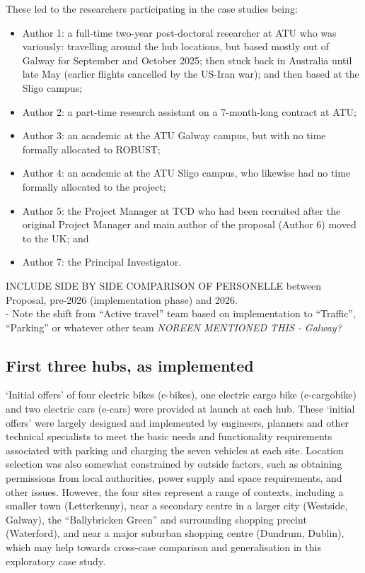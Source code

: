 \documentclass[preprint, 3p,
authoryear]{elsarticle} %
\providecommand{\tightlist}{%
  \setlength{\itemsep}{0pt}\setlength{\parskip}{0pt}}
\begin{document}
These led to the researchers participating in the case studies being:

\begin{itemize}
\tightlist
\item
  Author 1: a full-time two-year post-doctoral researcher at ATU who was
  variously: travelling around the hub locations, but based mostly out
  of Galway for September and October 2025; then stuck back in Australia
  until late May (earlier flights cancelled by the US-Iran war); and
  then based at the Sligo campus;
\item
  Author 2: a part-time research assistant on a 7-month-long contract at
  ATU;
\item
  Author 3: an academic at the ATU Galway campus, but with no time
  formally allocated to ROBUST;
\item
  Author 4: an academic at the ATU Sligo campus, who likewise had no
  time formally allocated to the project;
\item
  Author 5: the Project Manager at TCD who had been recruited after the
  original Project Manager and main author of the proposal (Author 6)
  moved to the UK; and
\item
  Author 7: the Principal Investigator.
\end{itemize}

INCLUDE SIDE BY SIDE COMPARISON OF PERSONELLE between Proposal, pre-2026
(implementation phase) and 2026.\\
- Note the shift from ``Active travel'' team based on implementation to
``Traffic'', ``Parking'' or whatever other team \emph{NOREEN MENTIONED
THIS - Galway?}

\subsection{First three hubs, as
implemented}\label{first-three-hubs-as-implemented}

`Initial offers' of four electric bikes (e-bikes), one electric cargo
bike (e-cargobike) and two electric cars (e-cars) were provided at
launch at each hub. These `initial offers' were largely designed and
implemented by engineers, planners and other technical specialists to
meet the basic needs and functionality requirements associated with
parking and charging the seven vehicles at each site. Location selection
was also somewhat constrained by outside factors, such as obtaining
permissions from local authorities, power supply and space requirements,
and other issues. However, the four sites represent a range of contexts,
including a smaller town (Letterkenny), near a secondary centre in a
larger city (Westside, Galway), the ``Ballybricken Green'' and
surrounding shopping precint (Waterford), and near a major suburban
shopping centre (Dundrum, Dublin), which may help towards cross-case
comparison and generalisation in this exploratory case study.
\end{document}

